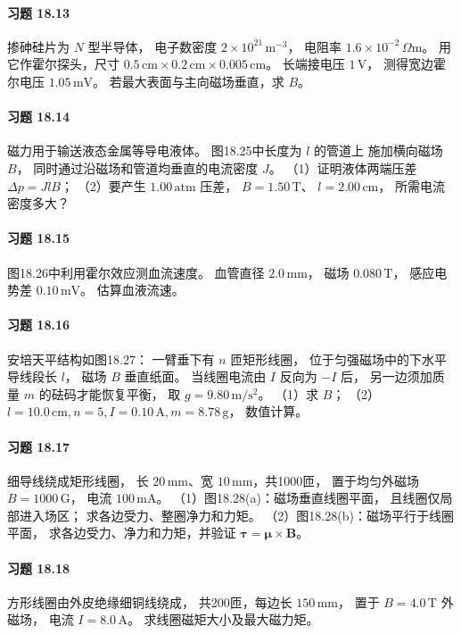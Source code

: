 \paragraph{习题 18.13}
掺砷硅片为 \(N\) 型半导体，
电子数密度 \(2\times10^{21}\,\mathrm{m^{-3}}\)，
电阻率 \(1.6\times10^{-2}\,\Omega\mathrm m\)。
用它作霍尔探头，尺寸
\(0.5\,\mathrm{cm}\times0.2\,\mathrm{cm}
\times0.005\,\mathrm{cm}\)。
长端接电压 \(1\,\mathrm V\)，
测得宽边霍尔电压 \(1.05\,\mathrm{mV}\)。
若最大表面与主向磁场垂直，求 \(B\)。

\paragraph{习题 18.14}
磁力用于输送液态金属等导电液体。
图18.25中长度为 \(l\) 的管道上
施加横向磁场 \(B\)，
同时通过沿磁场和管道均垂直的电流密度 \(J\)。
（1）证明液体两端压差
\(\Delta p=JlB\)；
（2）要产生
\(1.00\,\mathrm{atm}\) 压差，
\(B=1.50\,\mathrm T\)、
\(l=2.00\,\mathrm{cm}\)，
所需电流密度多大？

\paragraph{习题 18.15}
图18.26中利用霍尔效应测血流速度。
血管直径 \(2.0\,\mathrm{mm}\)，
磁场 \(0.080\,\mathrm T\)，
感应电势差 \(0.10\,\mathrm{mV}\)。
估算血液流速。

\paragraph{习题 18.16}
安培天平结构如图18.27：
一臂垂下有 \(n\) 匝矩形线圈，
位于匀强磁场中的下水平导线段长 \(l\)，
磁场 \(B\) 垂直纸面。
当线圈电流由 \(I\) 反向为 \(-I\) 后，
另一边须加质量 \(m\) 的砝码才能恢复平衡，
取 \(g=9.80\,\mathrm{m/s^2}\)。
（1）求 \(B\)；
（2）\(l=10.0\,\mathrm{cm},n=5,
 I=0.10\,\mathrm A,m=8.78\,\mathrm g\)，
数值计算。

\paragraph{习题 18.17}
细导线绕成矩形线圈，
长 \(20\,\mathrm{mm}\)、宽
\(10\,\mathrm{mm}\)，共1000匝，
置于均匀外磁场 \(B=1000\,\mathrm G\)，
电流 \(100\,\mathrm{mA}\)。
（1）图18.28(a)：磁场垂直线圈平面，
且线圈仅局部进入场区；
求各边受力、整圈净力和力矩。
（2）图18.28(b)：磁场平行于线圈平面，
求各边受力、净力和力矩，并验证
\(\boldsymbol\tau=\boldsymbol\mu\times\boldsymbol B\)。

\paragraph{习题 18.18}
方形线圈由外皮绝缘细铜线绕成，
共200匝，每边长 \(150\,\mathrm{mm}\)，
置于 \(B=4.0\,\mathrm T\) 外磁场，
电流 \(I=8.0\,\mathrm A\)。
求线圈磁矩大小及最大磁力矩。


